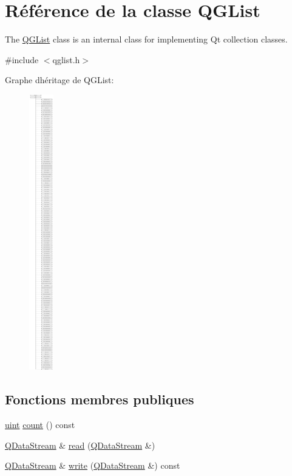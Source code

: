 \hypertarget{class_q_g_list}{}\section{Référence de la classe Q\+G\+List}
\label{class_q_g_list}


The \hyperlink{class_q_g_list}{Q\+G\+List} class is an internal class for implementing Qt collection classes.  




{\ttfamily \#include $<$qglist.\+h$>$}

Graphe d\textquotesingle{}héritage de Q\+G\+List\+:\begin{figure}[H]
\begin{center}
\leavevmode
\includegraphics[height=12.000000cm]{class_q_g_list}
\end{center}
\end{figure}
\subsection*{Fonctions membres publiques}
\begin{DoxyCompactItemize}
\item 
\hyperlink{qglobal_8h_a4d3943ddea65db7163a58e6c7e8df95a}{uint} \hyperlink{class_q_g_list_a7387747a627fde0b8003f417ef2f3eda}{count} () const 
\item 
\hyperlink{class_q_data_stream}{Q\+Data\+Stream} \& \hyperlink{class_q_g_list_a92e5a02569162c5951a90bca606223a2}{read} (\hyperlink{class_q_data_stream}{Q\+Data\+Stream} \&)
\item 
\hyperlink{class_q_data_stream}{Q\+Data\+Stream} \& \hyperlink{class_q_g_list_a03713abae9948cba74cfadfd4b0bd4f7}{write} (\hyperlink{class_q_data_stream}{Q\+Data\+Stream} \&) const 
\end{DoxyCompactItemize}
